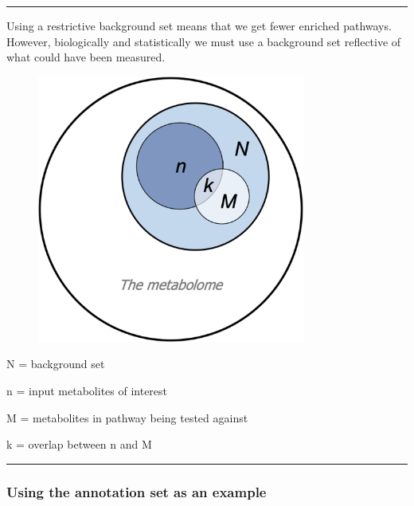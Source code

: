 \documentclass[
  24px,
  letterpaper,
  DIV=11,
  numbers=noendperiod]{scrartcl}
\newenvironment{Shaded}{\begin{snugshade}}{\end{snugshade}}
\newcommand{\AttributeTok}[1]{\textcolor[rgb]{0.40,0.45,0.13}{#1}}
\newcommand{\FunctionTok}[1]{\textcolor[rgb]{0.28,0.35,0.67}{#1}}
\newcommand{\NormalTok}[1]{\textcolor[rgb]{0.00,0.23,0.31}{#1}}
\newcommand{\OtherTok}[1]{\textcolor[rgb]{0.00,0.23,0.31}{#1}}
\newcommand{\SpecialCharTok}[1]{\textcolor[rgb]{0.37,0.37,0.37}{#1}}
\begin{document}
\begin{center}\rule{0.5\linewidth}{0.5pt}\end{center}

Using a restrictive background set means that we get fewer enriched
pathways. However, biologically and statistically we must use a
background set reflective of what could have been measured.

\begin{figure}

{\centering \includegraphics[width=3.46875in,height=\textheight]{images/ora.PNG}

}

\end{figure}

N = background set

n = input metabolites of interest

M = metabolites in pathway being tested against

k = overlap between n and M

\begin{center}\rule{0.5\linewidth}{0.5pt}\end{center}

\hypertarget{using-the-annotation-set-as-an-example}{%
\subsubsection{Using the annotation set as an
example}\label{using-the-annotation-set-as-an-example}}

\begin{Shaded}
\end{Shaded}
\end{document}
